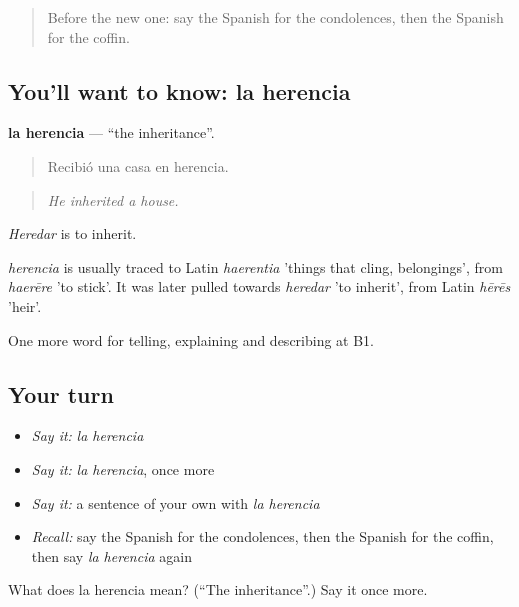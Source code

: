 \label{lesson:ES-C557-herencia}



\begin{quote}
Before the new one: say the Spanish for the condolences, then the Spanish for the coffin.
\end{quote}

\subsection*{You'll want to know: la herencia}
\textbf{la herencia} — \textquotedblleft{}the inheritance\textquotedblright{}.

\begin{quote}
Recibió una casa en herencia.
\end{quote}

\begin{quote}
\emph{He inherited a house.}
\end{quote}

\emph{Heredar} is to inherit.

\begin{cousinweb}
\emph{herencia} is usually traced to Latin \emph{haerentia} 'things that cling, belongings', from \emph{haerēre} 'to stick'. It was later pulled towards \emph{heredar} 'to inherit', from Latin \emph{hērēs} 'heir'.
\end{cousinweb}

\begin{grammarlens}[title={What you've built}]
One more word for telling, explaining and describing at B1.
\end{grammarlens}

\subsection*{Your turn}
\begin{itemize}
\raggedright
  \item \emph{Say it:} \emph{la herencia}
  \item \emph{Say it:} \emph{la herencia}, once more
  \item \emph{Say it:} a sentence of your own with \emph{la herencia}
  \item \emph{Recall:} say the Spanish for the condolences, then the Spanish for the coffin, then say \emph{la herencia} again
\end{itemize}

\begin{tcolorbox}[breakable,colback=teal!4,colframe=teal!35!black,title={Before you move on}]
What does la herencia mean? (\textquotedblleft{}The inheritance\textquotedblright{}.) Say it once more.
\end{tcolorbox}
